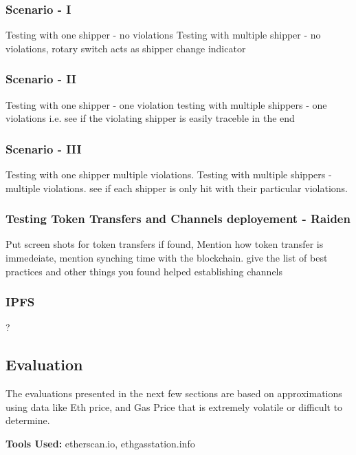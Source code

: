 \subsubsection{Scenario - I}
Testing with one shipper - no violations
Testing with multiple shipper - no violations, rotary switch acts as shipper change indicator
\subsubsection{Scenario - II}
Testing with one shipper - one violation
testing with multiple shippers - one violations i.e. see if the violating shipper is easily traceble in the end
\subsubsection{Scenario - III}
Testing with one shipper multiple violations.
Testing with multiple shippers - multiple violations. see if each shipper is only hit with their particular violations.

\subsubsection{Testing Token Transfers and Channels deployement - Raiden}
Put screen shots for token transfers if found, Mention how token transfer is immedeiate, mention synching time with the blockchain.
give the list of best practices and other things you found helped establishing channels
\subsubsection{IPFS}
?
\subsection{Evaluation}
The evaluations presented in the next few sections are based on approximations using data like Eth price, and Gas Price that is extremely volatile or difficult to determine.

\textbf{Tools Used:} etherscan.io, ethgasstation.info
